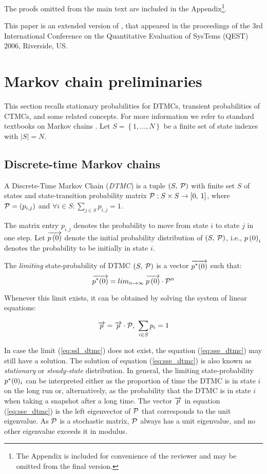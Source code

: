 \documentclass{entcs}
\newcommand{\Section}[1]{\section{#1}}
\newcommand{\SubSection}[1]{\subsection{#1}}
\begin{document}
The proofs omitted from the main text are included in the Appendix\footnote{The Appendix is included  for convenience of the reviewer and may be omitted from the final version.}.

This paper is an extended version of \cite{KatoenZ_QEST06}, that appeared in the proceedings of the 3rd International Conference on the Quantitative Evaluation of SysTems (QEST) 2006, Riverside, US.

\Section{Markov chain preliminaries \label{s:concepts}}

		This section recalls stationary probabilities for DTMCs, transient probabilities of CTMCs, and some related concepts.   For more information we refer to standard textbooks on Markov chains \cite{Tijms_03,Haverkort_98}.  Let $S = \left\{1, \ldots,N \right\}$ be a finite set of state indexes with $|S|=N$.
	
	\SubSection{Discrete-time Markov chains}

		\begin{definition}
		A Discrete-Time Markov Chain (\emph{DTMC}) is a tuple $\left( S,\: \mathcal{P} \right)$ with finite set $S$ of states and state-transition probability matrix $\mathcal{P} : S \times S \rightarrow \left[0,\:1 \right]$, where $\mathcal{P}=\left(p_{i,j}\right)$ and $\forall i \in S : \sum_{j \in S} p_{i,j}=1$.
		\end{definition}
		
		The matrix entry $p_{i,j}$ denotes the probability to move from state $i$ to state $j$ in one step.  Let $\overrightarrow{p \left( 0 \right)}$ denote the initial probability distribution of $\left( S,\: \mathcal{P} \right)$, i.e., $p\left( 0 \right)_{i}$ denotes the probability to be initially in state $i$.

		\begin{definition}
		The \emph{limiting} state-probability of  DTMC $\left( S,\: \mathcal{P} \right)$ is a vector $\overrightarrow{p^{*}(0)}$ such that:
			\begin{equation}
				\overrightarrow{p^{*}(0)} = lim_{n \to \infty} \: \overrightarrow{p \left( 0 \right)} \cdot \mathcal{P}^{n}
				\label{eq:ssl_dtmc}
			\end{equation}
		\end{definition}
		
		Whenever this limit exists, it can be obtained by solving the system of linear equations:
		
		\begin{equation}
			\overrightarrow{p} = \overrightarrow{p} \cdot \mathcal{P} \text{, }\sum_{i \in S} p_{i} = 1
			\label{eq:sse_dtmc}
		\end{equation}
				
		In case the limit (\ref{eq:ssl_dtmc}) does not exist, the equation (\ref{eq:sse_dtmc}) may still have a solution.  The solution of equation (\ref{eq:sse_dtmc}) is also known as \emph{stationary} or \emph{steady-state} distribution.	
		In general, the limiting state-probability $p^{*}(0)_{i}$ can be interpreted either as the proportion of time the DTMC is in state $i$ on the long run or, alternatively, as the probability that the DTMC is in state $i$ when taking a snapshot after a long time.  The vector $\overrightarrow{p}$ in equation (\ref{eq:sse_dtmc}) is the left eigenvector of $\mathcal{P}$ that corresponds to the unit eigenvalue.  As $\mathcal{P}$ is a stochastic matrix, $\mathcal{P}$ always has a unit eigenvalue, and no other eigenvalue exceeds it in modulus.
		
\end{document}
